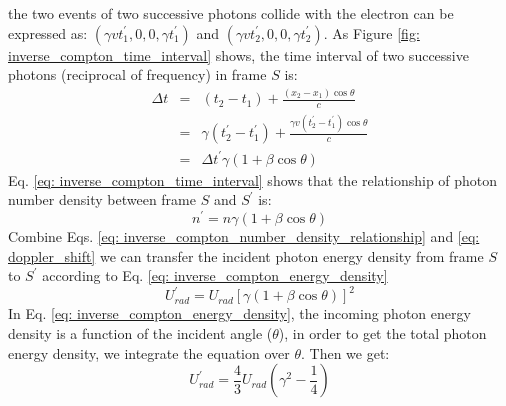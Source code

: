 \documentclass[12pt]{report}
\begin{document}
            the two events of two successive photons collide with the electron can be 
            expressed as:
            $\left(\gamma v t_{1}^{\prime}, 0, 0, \gamma t_{1}^{\prime}\right)$ and 
            $\left(\gamma v t_{2}^{\prime}, 0, 0, \gamma t_{2}^{\prime}\right)$. 
            As Figure \ref{fig: inverse_compton_time_interval} shows, the time interval of two 
            successive photons (reciprocal of frequency) in frame $S$ is: 
            \begin{eqnarray}
              \label{eq: inverse_compton_time_interval}
              \Delta t &=& \left(t_2 - t_1\right) + \frac{\left(x_2 - x_1\right) \cos{\theta}}{c}  \nonumber \\
                      &=& \gamma \left(t_{2}^{\prime} - t_{1}^{\prime}\right) + \frac{\gamma v \left(t_{2}^{\prime} - t_{1}^{\prime}\right) \cos{\theta}}{c} \nonumber \\
                      &=&  \Delta t^{\prime} \gamma \left(1 + \beta \cos{\theta}\right) 
            \end{eqnarray}
            Eq. \ref{eq: inverse_compton_time_interval} shows that the relationship of photon 
            number density between frame $S$ and $S^{\prime}$ is:
            \begin{equation}
              \label{eq: inverse_compton_number_density_relationship}
              n^{\prime} = n \gamma \left(1 + \beta \cos{\theta}\right) 
            \end{equation}
            Combine Eqs. \ref{eq: inverse_compton_number_density_relationship} and 
            \ref{eq: doppler_shift} we can transfer the incident photon energy density from 
            frame $S$ to $S^{\prime}$ according to Eq. \ref{eq: inverse_compton_energy_density}
            \begin{equation}
              \label{eq: inverse_compton_energy_density}
              U_{rad}^{\prime} = U_{rad} \left[\gamma \left(1 + \beta \cos{\theta}\right)\right]^{2}
            \end{equation}
            In Eq. \ref{eq: inverse_compton_energy_density}, the incoming photon energy density 
            is a function of the incident angle ($\theta$), in order to get the total photon 
            energy density, we integrate the equation over $\theta$. Then we get: 
            \begin{equation}
              \label{eq: inverse_compton_energy_density_total}
              U_{rad}^{\prime} = \frac{4}{3} U_{rad} \left(\gamma^2 - \frac{1}{4}\right)
            \end{equation}
\end{document}
